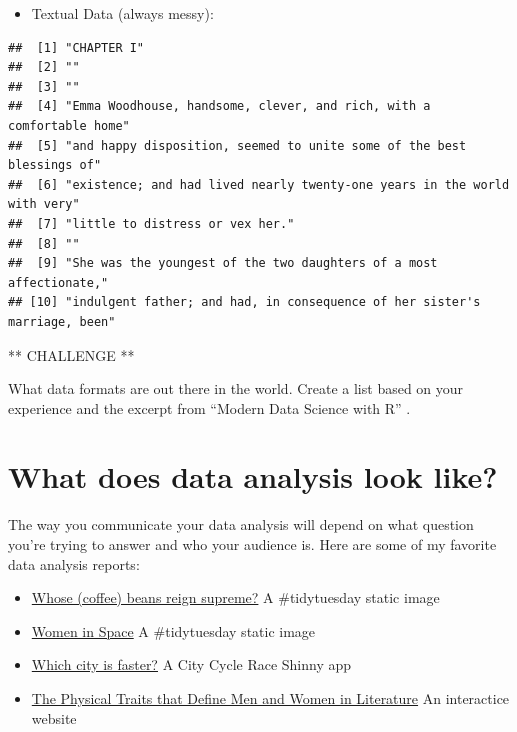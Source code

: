 \documentclass[
]{book}
\providecommand{\tightlist}{%
  \setlength{\itemsep}{0pt}\setlength{\parskip}{0pt}}
\begin{document}
\begin{itemize}
\tightlist
\item
  Textual Data (always messy):
\end{itemize}

\begin{verbatim}
##  [1] "CHAPTER I"                                                               
##  [2] ""                                                                        
##  [3] ""                                                                        
##  [4] "Emma Woodhouse, handsome, clever, and rich, with a comfortable home"     
##  [5] "and happy disposition, seemed to unite some of the best blessings of"    
##  [6] "existence; and had lived nearly twenty-one years in the world with very" 
##  [7] "little to distress or vex her."                                          
##  [8] ""                                                                        
##  [9] "She was the youngest of the two daughters of a most affectionate,"       
## [10] "indulgent father; and had, in consequence of her sister's marriage, been"
\end{verbatim}

** CHALLENGE **

What data formats are out there in the world. Create a list based on your experience and the excerpt from ``Modern Data Science with R'' \citep{baumer2017modern}.

\hypertarget{what-does-data-analysis-look-like}{%
\section{What does data analysis look like?}\label{what-does-data-analysis-look-like}}

The way you communicate your data analysis will depend on what question you're trying to answer and who your audience is. Here are some of my favorite data analysis reports:

\begin{itemize}
\item
  \href{https://twitter.com/IsChiaThere/status/1282681472185401349/photo/1}{Whose (coffee) beans reign supreme?} A \#tidytuesday static image
\item
  \href{https://twitter.com/geokaramanis/status/1283410776913514496/photo/1}{Women in Space} A \#tidytuesday static image
\item
  \href{https://sebastianwolf.shinyapps.io/stravachaserapp/}{Which city is faster?} A City Cycle Race Shinny app
\item
  \href{https://pudding.cool/2020/07/gendered-descriptions/}{The Physical Traits that Define Men and Women in Literature} An interactice website
\end{itemize}
\end{document}
